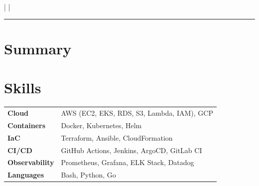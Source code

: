 \documentclass[10pt, a4paper]{article}
\newcommand{\contactitem}[1]{\small #1}
\begin{document}

\begin{center}
  {\LARGE\bfseries\color{accent} \VarName}\\[4pt]
  {\small \VarRole}\\[6pt]
  \contactitem{\VarEmail}
  \quad\textcolor{subtle}{|}\quad
  \contactitem{\VarPhone}
  \quad\textcolor{subtle}{|}\quad
  \contactitem{\VarLocation}
\end{center}

\vspace{4pt}
\textcolor{accent}{\rule{\linewidth}{0.8pt}}
\vspace{6pt}

\section{Summary}
\VarSummary

\section{Skills}
\noindent
\begin{tabularx}{\linewidth}{@{} l X @{}}
  \textbf{Cloud}          & AWS (EC2, EKS, RDS, S3, Lambda, IAM), GCP \\[2pt]
  \textbf{Containers}     & Docker, Kubernetes, Helm \\[2pt]
  \textbf{IaC}            & Terraform, Ansible, CloudFormation \\[2pt]
  \textbf{CI/CD}          & GitHub Actions, Jenkins, ArgoCD, GitLab CI \\[2pt]
  \textbf{Observability}  & Prometheus, Grafana, ELK Stack, Datadog \\[2pt]
  \textbf{Languages}      & Bash, Python, Go \\
\end{tabularx}

\end{document}
